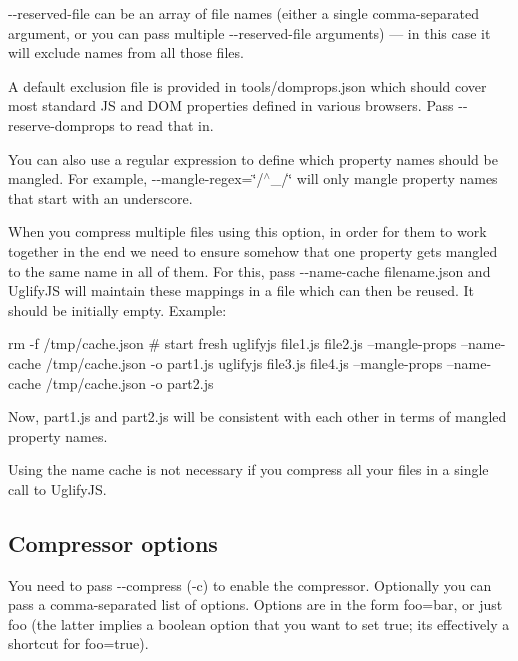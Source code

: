 {\ttfamily -\/-\/reserved-\/file} can be an array of file names (either a single comma-\/separated argument, or you can pass multiple {\ttfamily -\/-\/reserved-\/file} arguments) — in this case it will exclude names from all those files.

A default exclusion file is provided in {\ttfamily tools/domprops.\+json} which should cover most standard JS and D\+OM properties defined in various browsers. Pass {\ttfamily -\/-\/reserve-\/domprops} to read that in.

You can also use a regular expression to define which property names should be mangled. For example, {\ttfamily -\/-\/mangle-\/regex=\char`\"{}/$^\wedge$\+\_\+/\char`\"{}} will only mangle property names that start with an underscore.

When you compress multiple files using this option, in order for them to work together in the end we need to ensure somehow that one property gets mangled to the same name in all of them. For this, pass {\ttfamily -\/-\/name-\/cache filename.\+json} and Uglify\+JS will maintain these mappings in a file which can then be reused. It should be initially empty. Example\+:


\begin{DoxyCode}
rm -f /tmp/cache.json  # start fresh
uglifyjs file1.js file2.js --mangle-props --name-cache /tmp/cache.json -o part1.js
uglifyjs file3.js file4.js --mangle-props --name-cache /tmp/cache.json -o part2.js
\end{DoxyCode}


Now, {\ttfamily part1.\+js} and {\ttfamily part2.\+js} will be consistent with each other in terms of mangled property names.

Using the name cache is not necessary if you compress all your files in a single call to Uglify\+JS.

\subsection*{Compressor options}

You need to pass {\ttfamily -\/-\/compress} ({\ttfamily -\/c}) to enable the compressor. Optionally you can pass a comma-\/separated list of options. Options are in the form {\ttfamily foo=bar}, or just {\ttfamily foo} (the latter implies a boolean option that you want to set {\ttfamily true}; it\textquotesingle{}s effectively a shortcut for {\ttfamily foo=true}).


